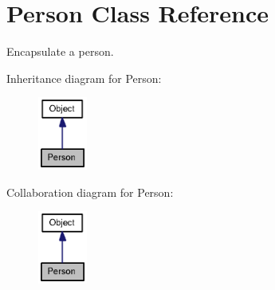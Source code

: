 \hypertarget{class_person}{
\section{Person Class Reference}
\label{class_person}
}
Encapsulate a person.  


Inheritance diagram for Person:\nopagebreak
\begin{figure}[H]
\begin{center}
\leavevmode
\includegraphics[width=46pt]{class_person__inherit__graph}
\end{center}
\end{figure}
Collaboration diagram for Person:\nopagebreak
\begin{figure}[H]
\begin{center}
\leavevmode
\includegraphics[width=46pt]{class_person__coll__graph}
\end{center}
\end{figure}
